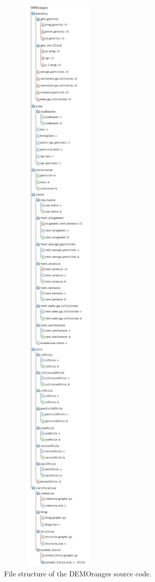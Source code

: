 \documentclass[../Interim_Report_Master]{subfiles}
\begin{document}
\begin{figure}
	\centering
	\includegraphics*[width=0.5\textwidth, trim=0 0 0 1180, clip]{./Diagrams/DEMOranges_Structure/DEMOranges_Structure.pdf}
	\caption{File structure of the DEMOranges source code.}
	\label{demorange_struct}
\end{figure}
\end{document}
